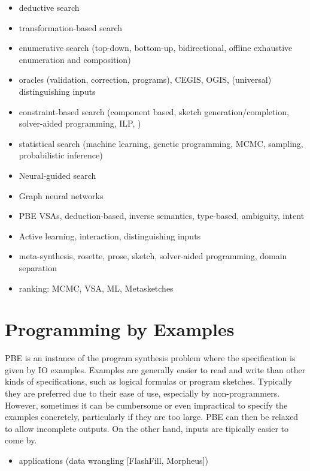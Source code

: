 \begin{itemize}
\item deductive search
\item transformation-based search
\item enumerative search (top-down, bottom-up, bidirectional, offline exhaustive enumeration and composition)
\item oracles (validation, correction, programs), CEGIS, OGIS, (universal) distinguishing inputs
\item constraint-based search (component based, sketch generation/completion, solver-aided programming, ILP, )
\item statistical search (machine learning, genetic programming, MCMC, sampling, probabilistic inference)
\item Neural-guided search
\item Graph neural networks
\item PBE VSAs, deduction-based, inverse semantics, type-based, ambiguity, intent
\item Active learning, interaction, distinguishing inputs
\item meta-synthesis, rosette, prose, sketch, solver-aided programming, domain separation
\item ranking: MCMC, VSA, ML, Metasketches
\end{itemize}

\section{Programming by Examples}
\label{sec:pbe}


\ac{PBE} is an instance of the program synthesis problem where the specification
is given by \ac{IO} examples.  Examples are generally easier to read and write than other kinds of
specifications, such as logical formulas or program sketches. Typically they are
preferred due to their ease of use, especially by non-programmers. However,
sometimes it can be cumbersome or even impractical to specify the examples
concretely, particularly if they are too large. 
\ac{PBE} can then be relaxed to allow incomplete outputs.  On the other hand,  inputs are tipically easier to come
by.

\begin{itemize}
\item applications (data wrangling [FlashFill, Morpheus])
\end{itemize}

